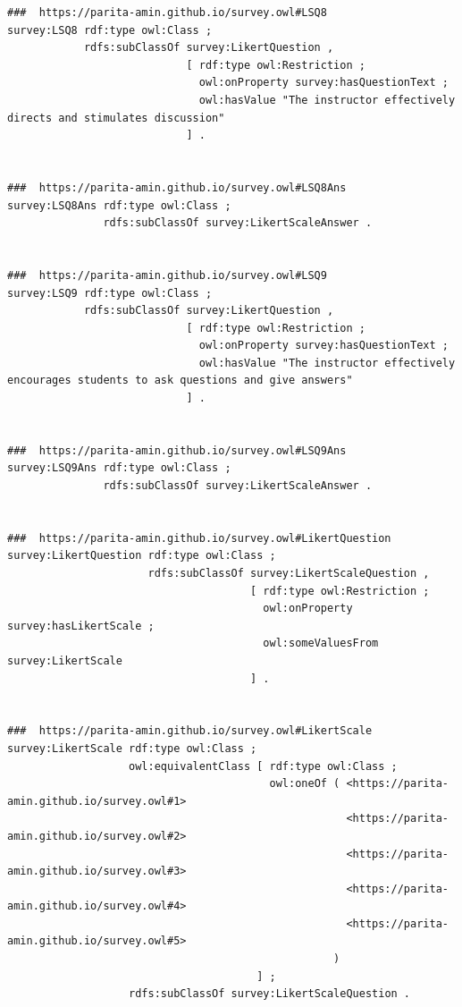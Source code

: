 \begin{lstlisting}
###  https://parita-amin.github.io/survey.owl#LSQ8
survey:LSQ8 rdf:type owl:Class ;
            rdfs:subClassOf survey:LikertQuestion ,
                            [ rdf:type owl:Restriction ;
                              owl:onProperty survey:hasQuestionText ;
                              owl:hasValue "The instructor effectively directs and stimulates discussion"
                            ] .


###  https://parita-amin.github.io/survey.owl#LSQ8Ans
survey:LSQ8Ans rdf:type owl:Class ;
               rdfs:subClassOf survey:LikertScaleAnswer .


###  https://parita-amin.github.io/survey.owl#LSQ9
survey:LSQ9 rdf:type owl:Class ;
            rdfs:subClassOf survey:LikertQuestion ,
                            [ rdf:type owl:Restriction ;
                              owl:onProperty survey:hasQuestionText ;
                              owl:hasValue "The instructor effectively encourages students to ask questions and give answers"
                            ] .


###  https://parita-amin.github.io/survey.owl#LSQ9Ans
survey:LSQ9Ans rdf:type owl:Class ;
               rdfs:subClassOf survey:LikertScaleAnswer .


###  https://parita-amin.github.io/survey.owl#LikertQuestion
survey:LikertQuestion rdf:type owl:Class ;
                      rdfs:subClassOf survey:LikertScaleQuestion ,
                                      [ rdf:type owl:Restriction ;
                                        owl:onProperty survey:hasLikertScale ;
                                        owl:someValuesFrom survey:LikertScale
                                      ] .


###  https://parita-amin.github.io/survey.owl#LikertScale
survey:LikertScale rdf:type owl:Class ;
                   owl:equivalentClass [ rdf:type owl:Class ;
                                         owl:oneOf ( <https://parita-amin.github.io/survey.owl#1>
                                                     <https://parita-amin.github.io/survey.owl#2>
                                                     <https://parita-amin.github.io/survey.owl#3>
                                                     <https://parita-amin.github.io/survey.owl#4>
                                                     <https://parita-amin.github.io/survey.owl#5>
                                                   )
                                       ] ;
                   rdfs:subClassOf survey:LikertScaleQuestion .



\end{lstlisting}
